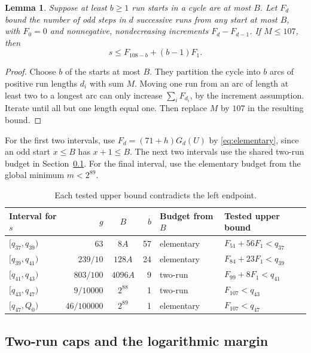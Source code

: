 \documentclass[11pt]{article}
\newtheorem{lemma}[theorem]{Lemma}
\theoremstyle{definition}
\begin{document}
\begin{lemma}\label{lem:split}
Suppose at least \(b\ge1\) run starts in a cycle are at most \(B\).
Let \(F_d\) bound the number of odd steps in \(d\) successive runs
from any start at most \(B\), with \(F_0=0\) and nonnegative,
nondecreasing increments \(F_d-F_{d-1}\). If \(M\le107\), then
\[
 s\le F_{108-b}+(b-1)F_1 .
\]
\end{lemma}

\begin{proof}
Choose \(b\) of the starts at most \(B\). They partition the cycle
into \(b\) arcs of positive run lengths \(d_i\) with sum \(M\).
Moving one run from an arc of length at least two to a longest arc
can only increase \(\sum_i F_{d_i}\), by the increment assumption.
Iterate until all but one length equal one. Then replace \(M\) by
\(107\) in the resulting bound.
\end{proof}

For the first two intervals, use \(F_d=(71+h)G_d(U)\) by
\eqref{eq:elementary}, since an odd start \(x\le B\) has \(x+1\le B\).
The next two intervals use the shared two-run budget in
Section~\ref{sec:caps}. For the final interval, use the elementary
budget from the global minimum \(m<2^{89}\).

\begin{table}[htbp]
\centering
\begin{tabular}{@{}l r c r ll@{}}
\toprule
Interval for \(s\) & \(g\) & \(B\) & \(b\) &
Budget from \(B\) & Tested upper bound\\
\midrule
\([q_{37},q_{39})\) & \(63\) & \(8A\) & 57 & elementary &
  \(F_{51}+56F_1<q_{37}\)\\
\([q_{39},q_{41})\) & \(239/10\) & \(128A\) & 24 & elementary &
  \(F_{84}+23F_1<q_{39}\)\\
\([q_{41},q_{43})\) & \(803/100\) & \(4096A\) & 9 & two-run &
  \(F_{99}+8F_1<q_{41}\)\\
\([q_{43},q_{47})\) & \(9/10000\) & \(2^{88}\) & 1 & two-run &
  \(F_{107}<q_{43}\)\\
\([q_{47},Q_0)\) & \(46/100000\) & \(2^{89}\) & 1 & elementary &
  \(F_{107}<q_{47}\)\\
\bottomrule
\end{tabular}
\caption{Each tested upper bound contradicts the left endpoint.}
\label{tab:bands}
\end{table}

\subsection{Two-run caps and the logarithmic margin}\label{sec:caps}
\end{document}
